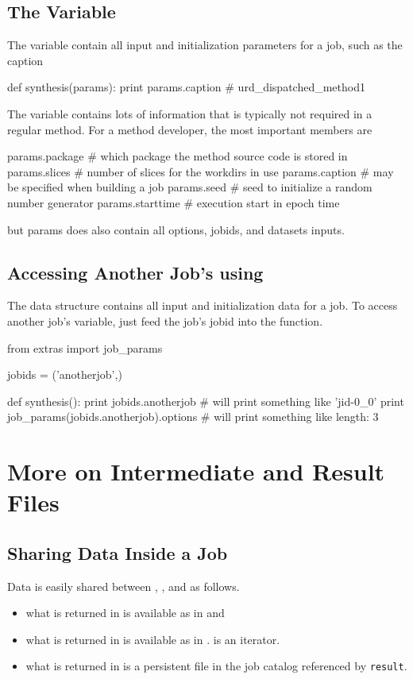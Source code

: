 \subsection{The \params Variable }
The \params variable contain all input and initialization parameters
for a job, such as the caption
\begin{python}
def synthesis(params):
  print params.caption
# urd_dispatched_method1
\end{python}
The \params variable contains lots of information that is typically
not required in a regular method.  For a method developer, the most
important members are
\begin{python}
params.package     # which package the method source code is stored in
params.slices      # number of slices for the workdirs in use
params.caption     # may be specified when building a job
params.seed        # seed to initialize a random number generator
params.starttime   # execution start in epoch time
\end{python}
but params does also contain all options, jobids, and datasets inputs.



\subsection{Accessing Another Job's \params using \jobparams}

The \params data structure contains all input and initialization data
for a job.  To access another job's \params variable, just feed the
job's jobid into the \jobparams function.
\begin{python}
from extras import job_params

jobids = ('anotherjob',)

def synthesis():
  print jobids.anotherjob
  # will print something like 'jid-0_0'
  print job_params(jobids.anotherjob).options
  # will print something like {length: 3}
\end{python}




\newpage
\section{More on Intermediate and Result Files}

\subsection{Sharing Data Inside a Job}
Data is easily shared between \prepare, \analysis, and \synthesis as
follows.
\begin{itemize}
\item what is returned in \prepare is available as \prepareres in \analysis and \synthesis
\item what is returned in \analysis is available as \analysisres in \synthesis.  \analysisres is an iterator.
\item what is returned in \synthesis is a persistent file in the job catalog referenced by \texttt{result}.
\end{itemize}

